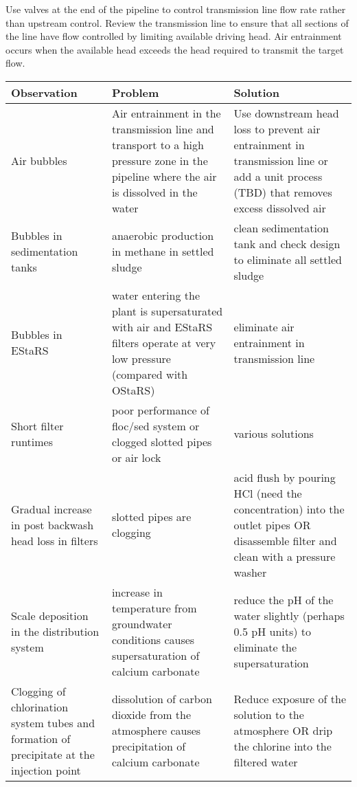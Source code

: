 \documentclass[letterpaper,10pt,english]{sphinxmanual}
\begin{document}
Use valves at the end of the pipeline to control transmission line flow rate rather than upstream control. Review the transmission line to ensure that all sections of the line have flow controlled by limiting available driving head. Air entrainment occurs when the available head exceeds the head required to transmit the target flow.


\begin{savenotes}\sphinxattablestart
\raggedright
{}
\label{\detokenize{Troubleshooting/Troubleshooting:id1}}\label{\detokenize{Troubleshooting/Troubleshooting:table-troubleshooting}}
\sphinxaftercaption
\begin{tabulary}{\linewidth}[t]{|T|T|T|}
\hline
\sphinxstyletheadfamily 
Observation
&\sphinxstyletheadfamily 
Problem
&\sphinxstyletheadfamily 
Solution
\\
\hline
Air bubbles
&
Air entrainment in the transmission line and transport to a high pressure zone in the pipeline where the air is dissolved in the water
&
Use downstream head loss to prevent air entrainment in transmission line or add a unit process (TBD) that removes excess dissolved air
\\
\hline
Bubbles in sedimentation tanks
&
anaerobic production in methane in settled sludge
&
clean sedimentation tank and check design to eliminate all settled sludge
\\
\hline
Bubbles in EStaRS
&
water entering the plant is supersaturated with air and EStaRS filters operate at very low pressure (compared with OStaRS)
&
eliminate air entrainment in transmission line
\\
\hline
Short filter runtimes
&
poor performance of floc/sed system or clogged slotted pipes or air lock
&
various solutions
\\
\hline
Gradual increase in post backwash head loss in filters
&
slotted pipes are clogging
&
acid flush by pouring HCl (need the concentration) into the outlet pipes OR disassemble filter and clean with a pressure washer
\\
\hline
Scale deposition in the distribution system
&
increase in temperature from groundwater conditions causes supersaturation of calcium carbonate
&
reduce the pH of the water slightly (perhaps 0.5 pH units) to eliminate the supersaturation
\\
\hline
Clogging of chlorination system tubes and formation of precipitate at the injection point
&
dissolution of carbon dioxide from the atmosphere causes precipitation of calcium carbonate
&
Reduce exposure of the solution to the atmosphere OR drip the chlorine into the filtered water
\\
\hline
\end{tabulary}
\par
\sphinxattableend\end{savenotes}
\end{document}
